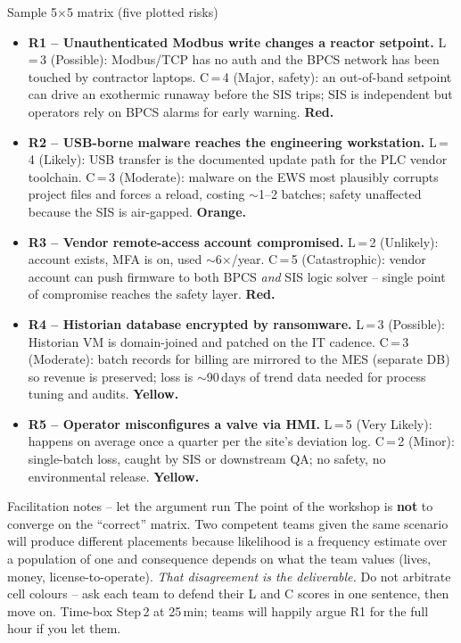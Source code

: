 \documentclass[11pt,a4paper]{article}
\begin{document}
\begin{solutionbox}{Sample 5$\times$5 matrix (five plotted risks)}
\begin{itemize}[leftmargin=*, nosep]
  \item \textbf{R1 -- Unauthenticated Modbus write changes a reactor setpoint.} L\,=\,3 (Possible): Modbus/TCP has no auth and the BPCS network has been touched by contractor laptops. C\,=\,4 (Major, safety): an out-of-band setpoint can drive an exothermic runaway before the SIS trips; SIS is independent but operators rely on BPCS alarms for early warning. \textbf{Red.}
  \item \textbf{R2 -- USB-borne malware reaches the engineering workstation.} L\,=\,4 (Likely): USB transfer is the documented update path for the PLC vendor toolchain. C\,=\,3 (Moderate): malware on the EWS most plausibly corrupts project files and forces a reload, costing $\sim$1--2 batches; safety unaffected because the SIS is air-gapped. \textbf{Orange.}
  \item \textbf{R3 -- Vendor remote-access account compromised.} L\,=\,2 (Unlikely): account exists, MFA is on, used $\sim$6$\times$/year. C\,=\,5 (Catastrophic): vendor account can push firmware to both BPCS \emph{and} SIS logic solver -- single point of compromise reaches the safety layer. \textbf{Red.}
  \item \textbf{R4 -- Historian database encrypted by ransomware.} L\,=\,3 (Possible): Historian VM is domain-joined and patched on the IT cadence. C\,=\,3 (Moderate): batch records for billing are mirrored to the MES (separate DB) so revenue is preserved; loss is $\sim$90\,days of trend data needed for process tuning and audits. \textbf{Yellow.}
  \item \textbf{R5 -- Operator misconfigures a valve via HMI.} L\,=\,5 (Very Likely): happens on average once a quarter per the site's deviation log. C\,=\,2 (Minor): single-batch loss, caught by SIS or downstream QA; no safety, no environmental release. \textbf{Yellow.}
\end{itemize}
\end{solutionbox}

\begin{solutionbox}{Facilitation notes -- let the argument run}
The point of the workshop is \textbf{not} to converge on the ``correct'' matrix. Two competent teams given the same scenario will produce different placements because likelihood is a frequency estimate over a population of one and consequence depends on what the team values (lives, money, license-to-operate). \emph{That disagreement is the deliverable.} Do not arbitrate cell colours -- ask each team to defend their L and C scores in one sentence, then move on. Time-box Step\,2 at 25\,min; teams will happily argue R1 for the full hour if you let them.
\end{solutionbox}
\end{document}
